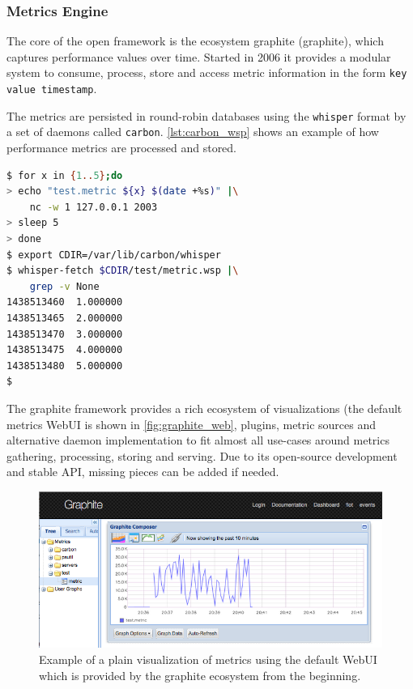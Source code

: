 \subsubsection{Metrics Engine}
\label{metricsengine}
The core of the open framework is the ecosystem \gls{graphite} (\glsdesc{graphite}), which captures performance values over time. 
Started in 2006 it provides a modular system to consume, process, store and access metric information in the form \texttt{key value timestamp}.

The metrics are persisted in round-robin databases using the \texttt{whisper} format by a set of daemons called \texttt{carbon}.
\autoref{lst:carbon_wsp} shows an example of how performance metrics are processed and stored.

\begin{lstlisting}[language=bash,
    caption={Sending metric strings \texttt{test.metric <value> <timestamp>} via \texttt{netcat} (short \texttt{nc}) to the carbon daemon (port \texttt{2003}). Afterward reading the \texttt{timestamp, value} pairs for the specific \texttt{whisper} file.},
    label={lst:carbon_wsp}]
$ for x in {1..5};do
> echo "test.metric ${x} $(date +%s)" |\
    nc -w 1 127.0.0.1 2003
> sleep 5
> done
$ export CDIR=/var/lib/carbon/whisper
$ whisper-fetch $CDIR/test/metric.wsp |\
    grep -v None
1438513460	1.000000
1438513465	2.000000
1438513470	3.000000
1438513475	4.000000
1438513480	5.000000
$
\end{lstlisting}

The \gls{graphite} framework provides a rich ecosystem of visualizations (the default metrics WebUI is shown in \autoref{fig:graphite_web}, plugins, metric sources and alternative daemon implementation to fit almost
all use-cases around metrics gathering, processing, storing and serving. Due to its open-source development and stable API, missing pieces
can be added if needed.

\begin{figure}[!ht]
    \includegraphics[width=.4\textwidth]{images/png/graphite_web.png}
    \caption{\label{fig:graphite_web}Example of a plain visualization of metrics using the default WebUI which is provided by the \gls{graphite} ecosystem from the beginning.}
\end{figure}

